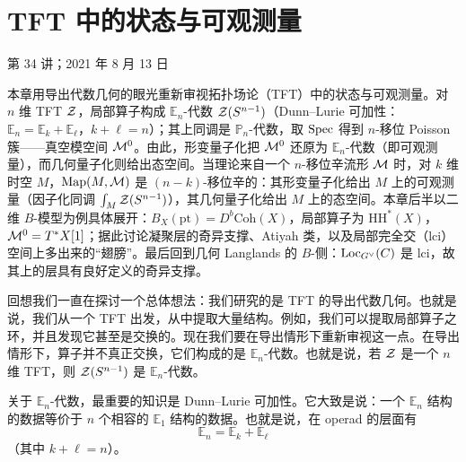 \chapter{TFT 中的状态与可观测量}\label{ch:15}

\begin{flushright}\small 第 34 讲；2021 年 8 月 13 日\end{flushright}

\begin{keytakeaways}
本章用导出代数几何的眼光重新审视拓扑场论（TFT）中的状态与可观测量。对 $n$ 维 TFT $\mathcal{Z}$，局部算子构成 $\mathbb{E}_n$-代数 $\mathcal{Z}(S^{n-1})$（Dunn--Lurie 可加性：$\mathbb{E}_n=\mathbb{E}_k+\mathbb{E}_\ell$，$k+\ell=n$）；其上同调是 $\mathbb{P}_n$-代数，取 $\mathrm{Spec}$ 得到 $n$-移位 Poisson 簇——真空模空间 $\mathcal{M}^0$。由此，形变量子化把 $\mathcal{M}^0$ 还原为 $\mathbb{E}_n$-代数（即可观测量），而几何量子化则给出态空间。当理论来自一个 $n$-移位辛流形 $\mathcal{M}$ 时，对 $k$ 维时空 $M$，$\mathrm{Map}(M,\mathcal{M})$ 是 $(n-k)$-移位辛的：其形变量子化给出 $M$ 上的可观测量（因子化同调 $\int_M\mathcal{Z}(S^{n-1})$），其几何量子化给出 $M$ 上的态空间。本章后半以二维 $B$-模型为例具体展开：$B_X(\mathrm{pt})=D^b\mathrm{Coh}(X)$，局部算子为 $\mathrm{HH}^*(X)$，$\mathcal{M}^0=T^*X[1]$；据此讨论凝聚层的奇异支撑、Atiyah 类，以及局部完全交（lci）空间上多出来的“翅膀”。最后回到几何 Langlands 的 $B$-侧：$\mathrm{Loc}_{G^\vee}(C)$ 是 lci，故其上的层具有良好定义的奇异支撑。
\end{keytakeaways}

回想我们一直在探讨一个总体想法：我们研究的是 TFT 的导出代数几何。也就是说，我们从一个 TFT 出发，从中提取大量结构。例如，我们可以提取局部算子之环，并且发现它甚至是交换的。现在我们要在导出情形下重新审视这一点。在导出情形下，算子并不真正交换，它们构成的是 $\mathbb{E}_n$-代数。也就是说，若 $\mathcal{Z}$ 是一个 $n$ 维 TFT，则 $\mathcal{Z}(S^{n-1})$ 是 $\mathbb{E}_n$-代数。

关于 $\mathbb{E}_n$-代数，最重要的知识是 Dunn--Lurie 可加性。它大致是说：一个 $\mathbb{E}_n$ 结构的数据等价于 $n$ 个相容的 $\mathbb{E}_1$ 结构的数据。也就是说，在 operad 的层面有
\begin{equation}\tag{15.1}
\mathbb{E}_n=\mathbb{E}_k+\mathbb{E}_\ell
\end{equation}
（其中 $k+\ell=n$）。%

